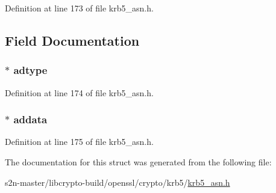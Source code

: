 Definition at line 173 of file krb5\+\_\+asn.\+h.



\subsection{Field Documentation}
\subsubsection[{\texorpdfstring{adtype}{adtype}}]{ $\ast$ adtype}\hypertarget{structkrb5__authorization__st_a2bff54a42c4451a51c8cbb5d65d03d27}{}\label{structkrb5__authorization__st_a2bff54a42c4451a51c8cbb5d65d03d27}


Definition at line 174 of file krb5\+\_\+asn.\+h.

\subsubsection[{\texorpdfstring{addata}{addata}}]{ $\ast$ addata}\hypertarget{structkrb5__authorization__st_a06170b1f23649e781758a51d7a65541f}{}\label{structkrb5__authorization__st_a06170b1f23649e781758a51d7a65541f}


Definition at line 175 of file krb5\+\_\+asn.\+h.



The documentation for this struct was generated from the following file\+:\begin{DoxyCompactItemize}
\item 
s2n-\/master/libcrypto-\/build/openssl/crypto/krb5/\hyperlink{crypto_2krb5_2krb5__asn_8h}{krb5\+\_\+asn.\+h}\end{DoxyCompactItemize}
